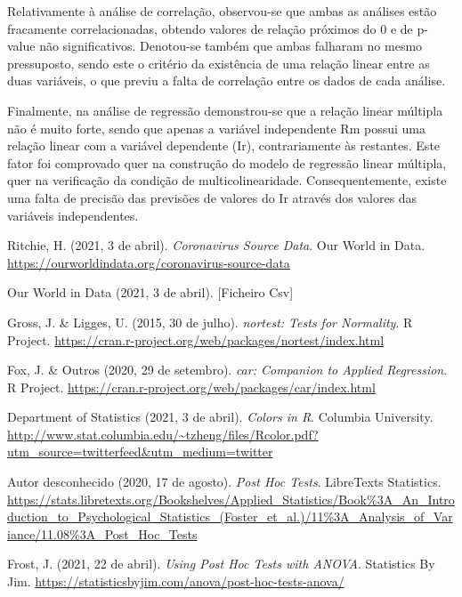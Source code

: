 \documentclass[conference]{IEEEtran}
\begin{document}
Relativamente à análise de correlação, observou-se que ambas as análises estão fracamente correlacionadas, obtendo valores de relação próximos do 0 e de p-value não significativos. Denotou-se também que ambas falharam no mesmo pressuposto, sendo este o critério da existência de uma relação linear entre as duas variáveis, o que previu a falta de correlação entre os dados de cada análise.

Finalmente, na análise de regressão demonstrou-se que a relação linear múltipla não é muito forte, sendo que apenas a variável independente Rm possui uma relação linear com a variável dependente (Ir), contrariamente às restantes. Este fator foi comprovado quer na construção do modelo de regressão linear múltipla, quer na verificação da condição de multicolinearidade. Consequentemente, existe uma falta de precisão das previsões de valores do Ir através dos valores das variáveis independentes.

\begin{thebibliography}{00}

 Ritchie, H. (2021, 3 de abril). \textit{Coronavirus Source Data}. Our World in Data. \url{https://ourworldindata.org/coronavirus-source-data}

 Our World in Data (2021, 3 de abril). [Ficheiro Csv]

 Gross, J. \& Ligges, U. (2015, 30 de julho). \textit{nortest: Tests for Normality}. R Project. \url{https://cran.r-project.org/web/packages/nortest/index.html}

 Fox, J. \& Outros (2020, 29 de setembro). \textit{car: Companion to Applied Regression}. R Project. \url{https://cran.r-project.org/web/packages/car/index.html}

 Department of Statistics (2021, 3 de abril). \textit{Colors in R}. Columbia University. \url{http://www.stat.columbia.edu/~tzheng/files/Rcolor.pdf?utm_source=twitterfeed&utm_medium=twitter}

 Autor desconhecido (2020, 17 de agosto). \textit{Post Hoc Tests}. LibreTexts Statistics. \url{https://stats.libretexts.org/Bookshelves/Applied_Statistics/Book\%3A_An_Introduction_to_Psychological_Statistics_(Foster_et_al.)/11\%3A_Analysis_of_Variance/11.08\%3A_Post_Hoc_Tests}

 Frost, J. (2021, 22 de abril). \textit{Using Post Hoc Tests with ANOVA}. Statistics By Jim. \url{https://statisticsbyjim.com/anova/post-hoc-tests-anova/}

\end{thebibliography}

\end{document}
